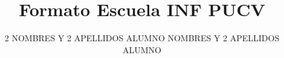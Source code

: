 \documentclass[siglas, glosario, tesis]{INFFormat}
\title{Formato Escuela INF PUCV}
\author{
    2 NOMBRES Y 2 APELLIDOS ALUMNO
    \authorspace
    2 NOMBRES Y 2 APELLIDOS ALUMNO
}
\date{\MONTH\ \YEAR}
\begin{document}
    \maketitle

    \makecorpus
    
    
    

    
    
    
    
    
    
    
    
\end{document}
